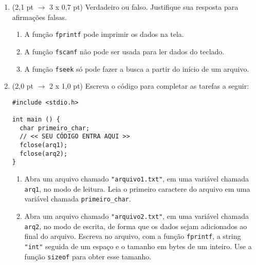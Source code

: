 \documentclass[a4paper,10pt]{article}
\begin{document}
\begin{multicols*}{2}
\begin{enumerate}
  \item (2,1 pt $\rightarrow$ 3 x 0,7 pt) Verdadeiro ou falso. Justifique sua resposta para afirmações falsas.

  \begin{enumerate}
    \item A função \texttt{fprintf} pode imprimir os dados na tela. %
    \item A função \texttt{fscanf} não pode ser usada para ler dados do teclado. %
    \item A função \texttt{fseek} só pode fazer a busca a partir do início de um arquivo. %
  \end{enumerate}

  \item (2,0 pt $\rightarrow$ 2 x 1,0 pt) Escreva o código para completar as tarefas a seguir:

  \begin{verbatim}
#include <stdio.h>

int main () {
  char primeiro_char;
  // << SEU CÓDIGO ENTRA AQUI >>
  fclose(arq1);
  fclose(arq2);
}
  \end{verbatim}

  \begin{enumerate}
    \item Abra um arquivo chamado \texttt{"arquivo1.txt"}, em uma variável chamada \texttt{arq1}, no modo de leitura. Leia o primeiro caractere do arquivo em uma variável chamada \texttt{primeiro\_char}.
    \item Abra um arquivo chamado \texttt{"arquivo2.txt"}, em uma variável chamada \texttt{arq2}, no modo de escrita, de forma que os dados sejam adicionados ao final do arquivo. Escreva no arquivo, com a função \texttt{fprintf}, a string \texttt{"int"} seguida de um espaço e o tamanho em bytes de um inteiro. Use a função \texttt{sizeof} para obter esse tamanho.
  \end{enumerate}


\end{enumerate}
\end{multicols*}
\end{document}
